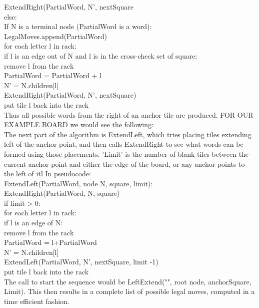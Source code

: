\documentclass[12pt]{article}
\begin{document}
{				ExtendRight(PartialWord, N', nextSquare\\
		else:\\
			If N is a terminal node (PartialWord is a word):\\
				LegalMoves.append(PartialWord)\\
			for each letter l in rack:\\
				if l is an edge out of N and l is in the cross-check set of square:\\
					remove l from the rack\\
					PartialWord = PartialWord + l\\
					N' = N.children[l]\\
					ExtendRight(PartialWord, N', nextSquare)\\
					put tile l back into the rack\\

Thus all possible words from the right of an anchor tile are produced. FOR OUR EXAMPLE BOARD we would see the following: \\

	The next part of the algorithm is ExtendLeft, which tries placing tiles extending left of the anchor point, and then calls ExtendRight to see what words can be formed using those placements. 'Limit' is the number of blank tiles between the current anchor point and either the edge of the board, or any anchor points to the left of itl 
	In pseudocode: \\
	ExtendLeft(PartialWord, node N, square, limit):\\
		ExtendRight(PartialWord, N, square)\\
		if limit > 0: \\
			for each letter l in rack: \\
				if l is an edge of N: \\
					remove l from the rack\\
					PartialWord = l+PartialWord\\
					N' = N.children[l]\\
					ExtendLeft(PartialWord, N', nextSquare, limit -1)\\
					put tile l back into the rack\\
			
The call to start the sequence would be LeftExtend("", root node, anchorSquare, Limit). This then results in a complete list of possible legal moves, computed in a time efficient fashion.  

}
\end{document}
